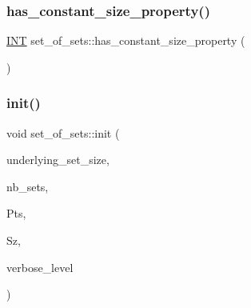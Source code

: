 \mbox{\label{classset__of__sets_a20446ba8c654822d460fd99c6cbabc09}} 
\subsubsection{\texorpdfstring{has\+\_\+constant\+\_\+size\+\_\+property()}{has\_constant\_size\_property()}}
{\footnotesize\ttfamily \mbox{\hyperlink{galois_8h_a09fddde158a3a20bd2dcadb609de11dc}{I\+NT}} set\+\_\+of\+\_\+sets\+::has\+\_\+constant\+\_\+size\+\_\+property (\begin{DoxyParamCaption}{ }\end{DoxyParamCaption})}

\mbox{\label{classset__of__sets_a6801510e52b5d426350058ee0da5ed41}} 
\subsubsection{\texorpdfstring{init()}{init()}}
{\footnotesize\ttfamily void set\+\_\+of\+\_\+sets\+::init (\begin{DoxyParamCaption}\item[{\mbox{\hyperlink{galois_8h_a09fddde158a3a20bd2dcadb609de11dc}{I\+NT}}}]{underlying\+\_\+set\+\_\+size,  }\item[{\mbox{\hyperlink{galois_8h_a09fddde158a3a20bd2dcadb609de11dc}{I\+NT}}}]{nb\+\_\+sets,  }\item[{\mbox{\hyperlink{galois_8h_a09fddde158a3a20bd2dcadb609de11dc}{I\+NT}} $\ast$$\ast$}]{Pts,  }\item[{\mbox{\hyperlink{galois_8h_a09fddde158a3a20bd2dcadb609de11dc}{I\+NT}} $\ast$}]{Sz,  }\item[{\mbox{\hyperlink{galois_8h_a09fddde158a3a20bd2dcadb609de11dc}{I\+NT}}}]{verbose\+\_\+level }\end{DoxyParamCaption})}

\mbox{\label{classset__of__sets_ae9b4f064df3c95d1aaec58ca6eeeb0ed}} 
